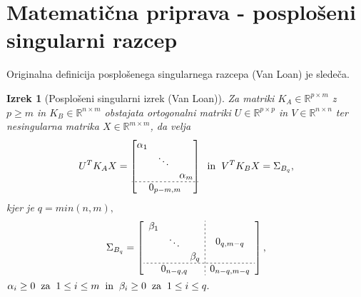 \documentclass[mat1]{article}
\newtheorem{izrek}{Izrek}
\begin{document}
\section{Matematična priprava - posplošeni singularni razcep}
Originalna definicija posplošenega singularnega razcepa (Van Loan) je sledeča.
\begin{izrek}[Posplošeni singularni izrek (Van Loan)]
\label{izrek:SVD} Za matriki $K_A \in \mathbb{R}^{p \times m}$ z $p \geq m$ in $K_B \in \mathbb{R}^{n \times m}$ obstajata ortogonalni matriki $U \in \mathbb{R}^{p \times p}$ in $V \in \mathbb{R}^{n \times n}$ ter nesingularna matrika $X \in \mathbb{R}^{m \times m}$, da velja 
$$ U^T K_A X = 
\begin{bmatrix}
\begin{matrix}
\alpha_1 & & \\
 & \ddots & \\
 & & \alpha_m
\end{matrix} \\ \hdashline[2pt/2pt]
0_{p-m, m}
\end{bmatrix} 
\hspace{2mm} \text{in} \hspace{2mm}
 V^T K_B X = 
\Sigma_{B_q} \text{,}
$$ kjer je $q = min(n,m) \text{,}$
\begin{gather*}
\Sigma_{B_q} = 
\left[
\begin{array}{c;{2pt/2pt}c}
\begin{matrix}
\beta_1 & & \\
 & \ddots & \\
 & & \beta_q
\end{matrix} & 0_{q, m - q}
 \\ \hdashline[2pt/2pt]
0_{n-q, q} & 0_{n-q, m-q}
\end{array} \right] \text{,} 
\end{gather*} %
$
\alpha_i \geq 0 \hspace{2mm} \text{za} \hspace{2mm}
 1 \leq i \leq m \hspace{2mm} \text{in} \hspace{2mm}
  \beta_i \geq 0 \hspace{2mm} \text{za} \hspace{2mm} 1 \leq i \leq q
\text{.}
$
\end{izrek}
\end{document}
